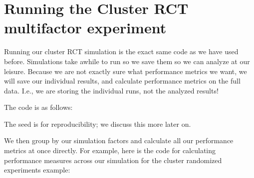 \documentclass[
]{book}
\newenvironment{Shaded}{\begin{snugshade}}{\end{snugshade}}
\newcommand{\AttributeTok}[1]{\textcolor[rgb]{0.77,0.63,0.00}{#1}}
\newcommand{\DecValTok}[1]{\textcolor[rgb]{0.00,0.00,0.81}{#1}}
\newcommand{\FunctionTok}[1]{\textcolor[rgb]{0.00,0.00,0.00}{#1}}
\newcommand{\NormalTok}[1]{#1}
\newcommand{\OtherTok}[1]{\textcolor[rgb]{0.56,0.35,0.01}{#1}}
\newcommand{\SpecialCharTok}[1]{\textcolor[rgb]{0.00,0.00,0.00}{#1}}
\newcommand{\StringTok}[1]{\textcolor[rgb]{0.31,0.60,0.02}{#1}}
\begin{document}
\hypertarget{running-the-cluster-rct-multifactor-experiment}{%
\section{Running the Cluster RCT multifactor experiment}\label{running-the-cluster-rct-multifactor-experiment}}

Running our cluster RCT simulation is the exact same code as we have used before.
Simulations take awhile to run so we save them so we can analyze at our leisure.
Because we are not exactly sure what performance metrics we want, we will save our individual results, and calculate performance metrics on the full data.
I.e., we are storing the individual runs, not the analyzed results!

The code is as follows:

\begin{Shaded}
\end{Shaded}

The seed is for reproducibility; we discuss this more later on.

We then group by our simulation factors and calculate all our performance metrics at once directly.
For example, here is the code for calculating performance measures across our simulation for the cluster randomized experiments example:
\end{document}
